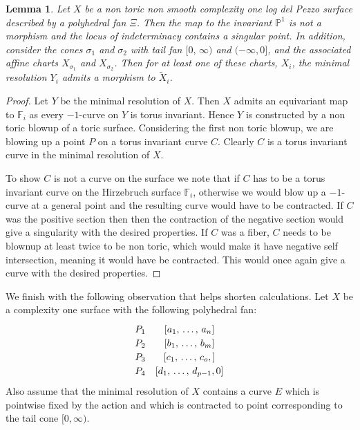 \documentclass[12pt,a4paper]{book}      %
\newtheorem{lem}[thm]{Lemma}
\theoremstyle{definition}
\newcommand{\mb}[1]{\mathbb{#1}}
\newcommand{\wt}[1]{\widetilde #1}
\begin{document}
\begin{lem}{\label{Structure}}
Let $X$ be a non toric non smooth complexity one log del Pezzo surface described by a polyhedral fan $\Xi$. Then the map to the invariant $\mb{P}^1$ is not a morphism and the locus of indeterminacy contains a singular point. In addition, consider the cones $\sigma_1$ and $\sigma_2$ with tail fan $[0, \, \infty)$ and $(-\infty, 0]$, and the associated affine charts $X_{\sigma_1}$ and $X_{\sigma_2}$. Then for at least one of these charts, $X_i$, the minimal resolution $Y_i$ admits a morphism to $\wt{X}_i$.

\end{lem}



\begin{proof}
Let $Y$ be the minimal resolution of $X$. Then $X$ admits an equivariant map to $\mb{F}_i$ as every $-1$-curve on $Y$ is torus invariant. Hence $Y$ is constructed by a non toric blowup of a toric surface. Considering the first non toric blowup, we are blowing up a point $P$ on a torus invariant curve $C$. Clearly $C$ is a torus invariant curve in the minimal resolution of $X$.

To show $C$ is not a curve on the surface we note that if $C$ has to be a torus invariant curve on the Hirzebruch surface $\mb{F}_i$, otherwise we would blow up a $-1$-curve at a general point and the resulting curve would have to be contracted. If $C$ was the positive section then then the contraction of the negative section would give a singularity with the desired properties. If $C$ was a fiber, $C$ needs to be blownup at least twice to be non toric, which would make it have negative self intersection, meaning it would have be contracted. This would once again give a curve with the desired properties.
\end{proof}



We finish with the following observation that helps shorten calculations.
Let $X$ be a complexity one surface with the following polyhedral fan:
\[\def\arraystretch{1.2}
\begin{array}{cc}
P_1 & \left[ a_1, \, \dots , \, a_n \right] \\ 
P_2 & \left[b_1 , \, \dots, \, b_m \right] \\
P_3 & \left[c_1, \, \dots, \, c_o, \right] \\
P_4 & \left[d_1, \, \dots, \, d_{p-1}, 0\right]  \\
\end{array}
\]
Also assume that the minimal resolution of $X$ contains a curve $E$ which is pointwise fixed by the action and which is contracted to point corresponding to the tail cone $[0, \infty)$.
\end{document}
